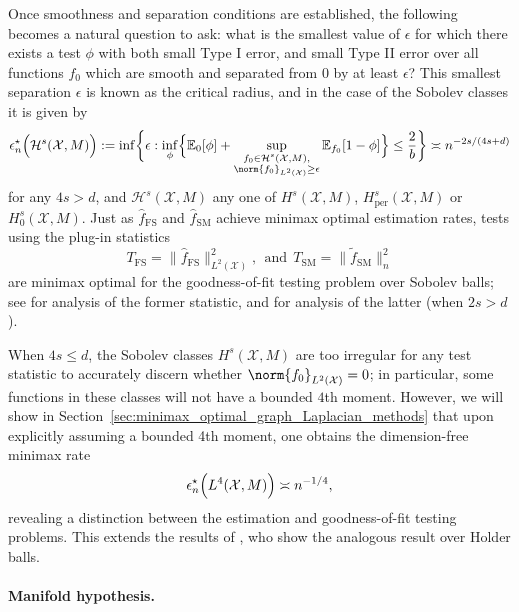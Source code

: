 \documentclass{article}
\newcommand{\1}{\mathbf{1}}
\newcommand{\Xset}{\mathcal{X}}
\newcommand{\Leb}{L}
\newcommand{\mc}[1]{\mathcal{#1}}
\newcommand{\Ebb}{\mathbb{E}}
\newcommand{\wt}[1]{\widetilde{#1}}
\newcommand{\wh}[1]{\widehat{#1}}
\newcommand{\SM}{\mathrm{SM}}
\newcommand{\OS}{\mathrm{FS}}
\theoremstyle{alden}
\theoremstyle{aldenthm}
\theoremstyle{definition}
\theoremstyle{remark}
\begin{document}
Once smoothness and separation conditions are established, the following becomes a natural question to ask: what is the smallest value of $\epsilon$ for which there exists a test $\phi$ with both small Type I error, and small Type II error over all functions $f_0$ which are smooth and separated from $0$ by at least $\epsilon$? This smallest separation $\epsilon$ is known as the critical radius, and in the case of the Sobolev classes it is given by
\begin{equation}
\label{eqn:sobolev_space_testing_critical_radius}
\epsilon_n^{\star}\Bigl(\mc{H}^s(\Xset,M)\Bigr):= \inf\biggl\{\epsilon: \inf_{\phi} \Bigl\{\Ebb_0[\phi] +  \sup_{\substack{f_0 \in \mc{H}^s(\Xset,M), \\ \norm{f_0}_{\Leb^2(\Xset)} \geq \epsilon}} \Ebb_{f_0}[1 - \phi]\Bigr\} \leq \frac{2}{b} \biggr\} \asymp n^{-2s/(4s + d)}
\end{equation}
for any $4s > d$, and $\mc{H}^s(\Xset,M)$ any one of $H^s(\Xset,M)$, $H_{\mathrm{per}}^s(\Xset,M)$ or $H_0^s(\Xset,M)$.  Just as $\wh{f}_{\OS}$ and $\wh{f}_{\SM}$ achieve minimax optimal estimation rates, tests using the plug-in statistics
\begin{equation*}
T_{\OS} = \bigl\|\wh{f}_{\OS}\bigr\|_{\Leb^2(\Xset)}^2,~~\textrm{and}~~T_{\SM} = \bigl\|\wt{f}_{\SM}\bigr\|_{n}^2
\end{equation*}
are minimax optimal for the goodness-of-fit testing problem over Sobolev balls; see \citet{ingster2009} for analysis of the former statistic, and \citet{liu2019} for analysis of the latter (when $2s > d$).

When $4s \leq d$, the Sobolev classes $H^s(\Xset,M)$ are too irregular for any test statistic to accurately discern whether $\norm{f_0}_{\Leb^2(\Xset)} = 0$; in particular, some functions in these classes will not have a bounded $4$th moment. However, we will show in Section~\ref{sec:minimax_optimal_graph_Laplacian_methods} that upon explicitly assuming a bounded 4th moment, one obtains the dimension-free minimax rate
\begin{equation*}
\epsilon_n^{\star}\Bigl(\Leb^4(\mc{X},M)\Bigr) \asymp n^{-1/4},
\end{equation*}
revealing a distinction between the estimation and goodness-of-fit testing problems. This extends the results of \cite{guerre02}, who show the analogous result over Holder balls.

\paragraph{Manifold hypothesis.}
\end{document}
